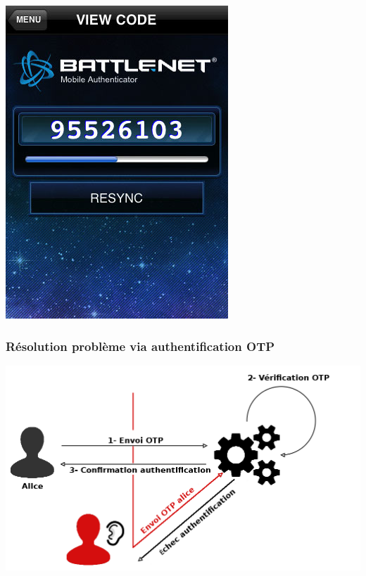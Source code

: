 \documentclass[xcolor=table]{beamer}
\begin{document}
\begin{frame}
\begin{center}
\includegraphics[scale=0.405]{../graphics/blizzardauth.jpg}
\end{center}
\end{frame}

\begin{frame}
\frametitle{Résolution problème via authentification OTP}
\includegraphics[scale=0.24]{../graphics/authsimple2.png}
\end{frame}
\end{document}
